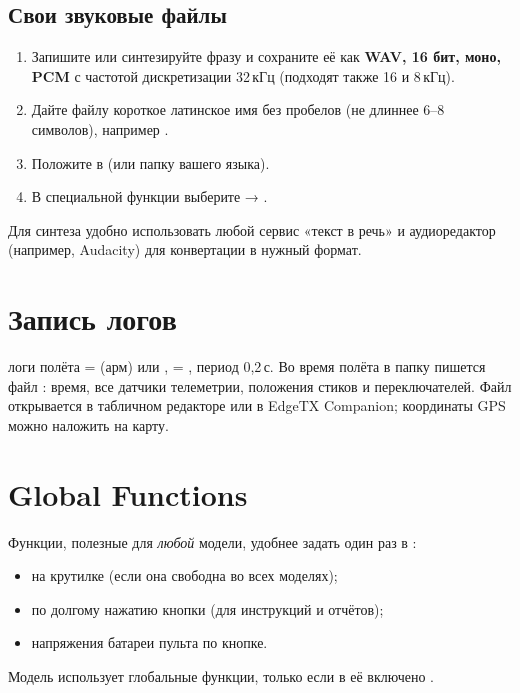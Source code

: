 \subsection{Свои звуковые файлы}

\begin{enumerate}
  \item Запишите или синтезируйте фразу и сохраните её как \textbf{WAV, 16 бит, моно, PCM}
        с частотой дискретизации 32\,кГц (подходят также 16 и 8\,кГц).
  \item Дайте файлу короткое латинское имя без пробелов (не длиннее 6--8 символов),
        например .
  \item Положите в  (или папку вашего языка).
  \item В специальной функции выберите  → .
\end{enumerate}

Для синтеза удобно использовать любой сервис «текст в речь» и аудиоредактор (например,
Audacity) для конвертации в нужный формат.

\section{Запись логов}

\begin{recipe}{логи полёта}
 =  (арм) или ,  = , период 0,2\,с.
Во время полёта в папку  пишется файл : время,
все датчики телеметрии, положения стиков и переключателей. Файл открывается в табличном
редакторе или в EdgeTX Companion; координаты GPS можно наложить на карту.
\end{recipe}

\section{Global Functions}

Функции, полезные для \emph{любой} модели, удобнее задать один раз в
:
\begin{itemize}
  \item {} на крутилке (если она свободна во всех моделях);
  \item {} по долгому нажатию кнопки (для инструкций и отчётов);
  \item {} напряжения батареи пульта по кнопке.
\end{itemize}
Модель использует глобальные функции, только если в её  включено
.

